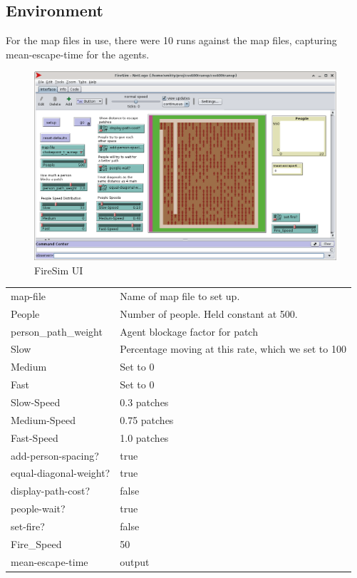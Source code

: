 \documentclass[12pt,letterpaper]{article}
\begin{document}
\subsection{Environment}
For the map files in use, there were 10 runs against the map files, capturing
mean-escape-time for the agents.
\begin{figure}
  \includegraphics[width=\linewidth]{./figures/fire_sim_ui.png}
  \caption{FireSim UI}
\end{figure}

\begin{tabular}{ l | l }
map-file & Name of map file to set up. \\
People & Number  of people. Held constant at 500. \\
person_path_weight & Agent blockage factor for patch \\
Slow & Percentage moving at this rate, which we set to 100 \\
Medium & Set to 0 \\
Fast & Set to 0 \\
Slow-Speed & 0.3 patches \\
Medium-Speed & 0.75 patches \\
Fast-Speed & 1.0 patches \\
add-person-spacing? & true \\
equal-diagonal-weight? & true \\
display-path-cost? & false \\
people-wait? & true \\
set-fire? & false \\
Fire_Speed & 50 \\
mean-escape-time & output \\
\end{tabular}
\end{document}
